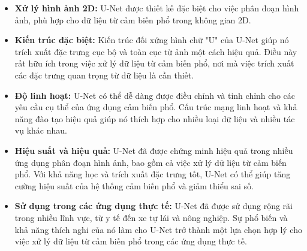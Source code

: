 \begin{itemize}
    \item \textbf{Xử lý hình ảnh 2D:} U-Net được thiết kế đặc biệt cho việc phân đoạn hình ảnh, phù hợp cho dữ liệu từ cảm biến phổ trong không gian 2D.
    \item \textbf{Kiến trúc đặc biệt:} Kiến trúc đối xứng hình chữ "U" của U-Net giúp nó trích xuất đặc trưng cục bộ và toàn cục từ ảnh một cách hiệu quả. Điều này rất hữu ích trong việc xử lý dữ liệu từ cảm biến phổ, nơi mà việc trích xuất các đặc trưng quan trọng từ dữ liệu là cần thiết.
    \item \textbf{Độ linh hoạt:} U-Net có thể dễ dàng được điều chỉnh và tinh chỉnh cho các yêu cầu cụ thể của ứng dụng cảm biến phổ. Cấu trúc mạng linh hoạt và khả năng đào tạo hiệu quả giúp nó thích hợp cho nhiều loại dữ liệu và nhiều tác vụ khác nhau.
    \item \textbf{Hiệu suất và hiệu quả:} U-Net đã được chứng minh hiệu quả trong nhiều ứng dụng phân đoạn hình ảnh, bao gồm cả việc xử lý dữ liệu từ cảm biến phổ. Với khả năng học và trích xuất đặc trưng tốt, U-Net có thể giúp tăng cường hiệu suất của hệ thống cảm biến phổ và giảm thiểu sai số.
    \item \textbf{Sử dụng trong các ứng dụng thực tế:} U-Net đã được sử dụng rộng rãi trong nhiều lĩnh vực, từ y tế đến xe tự lái và nông nghiệp. Sự phổ biến và khả năng thích nghi của nó làm cho U-Net trở thành một lựa chọn hợp lý cho việc xử lý dữ liệu từ cảm biến phổ trong các ứng dụng thực tế.
\end{itemize}



